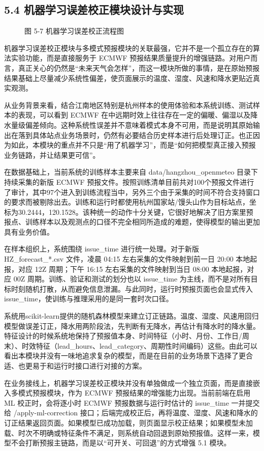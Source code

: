 \subsection{5.4 机器学习误差校正模块设计与实现}

\begin{figure}[htbp]
\centering
\caption{图 5-7  机器学习误差校正流程图}
\label{fig:5-7}
\end{figure}

机器学习误差校正模块与多模式预报模块的关联最强，它并不是一个孤立存在的算法实验功能，而是直接服务于 ECMWF 预报结果质量提升的增强链路。对用户而言，真正关心的仍然是“未来天气会怎样”，而这一模块所做的事情，是在原始预报结果基础上尽量减少系统性偏差，使页面展示的温度、湿度、风速和降水更贴近真实观测。

从业务背景来看，结合江南地区特别是杭州样本的使用体验和本系统训练、测试样本的表现，可以看到 ECMWF 在中远期时效上往往存在一定的偏暖、偏湿以及降水量级偏差倾向。这种系统性误差并不意味着模式本身不可用，而是说明其原始输出在落到具体站点业务场景时，仍然有必要结合历史样本进行后处理订正。也正因为如此，本模块的重点并不只是“用了机器学习”，而是“如何把模型真正接入预报业务链路，并让结果更可信”。

在数据基础上，当前系统的训练样本主要来自 data/hangzhou\_openmeteo 目录下持续采集的新版 ECMWF 预报文件。按照训练清单目前共对100个预报文件进行了审计，其中97个进入到训练流程当中，另外三个由于采集的时间不符合支持窗口的要求而被剔除出去。训练和运行时都使用杭州国家站/馒头山作为目标站点，坐标为30.2444，120.1528。该种统一的动作十分关键，它很好地解决了旧方案里预报点、训练样本以及观测点的口径不完全相同所造成的难题，使得模型的输出更加具有业务价值。

在样本组织上，系统围绕 issue\_time 进行统一处理。对于新版 HZ\_forecast\_*.csv 文件，凌晨 04:15 左右采集的文件映射到前一日 20:00 本地起报，对应 12Z 周期；下午 16:15 左右采集的文件映射到当日 08:00 本地起报，对应 00Z 周期。训练、验证和测试的划分也以 issue\_time 为主线，而不是对所有目标时刻随机打散，从而避免信息泄漏。与此同时，运行时预报页面也会显式传入 issue\_time，使训练与推理采用的是同一套时次口径。

系统用scikit-learn提供的随机森林模型来建立订正链路。温度、湿度、风速用回归模型做误差订正，降水用两阶段法，先判断有无降水，再估计有降水时的降水量。特征设计的时候系统地保持了预报值本身、时间特征（小时、月份、工作日/周末）、时效特征（lead\_hours、lead\_category、周期性时间编码）这些。由此可以看出本模块并没有一味地追求复杂的模型，而是在目前的业务场景下选择了更合适、也更易于和运行时接口进行对接的方案。

在业务接线上，机器学习误差校正模块并没有单独做成一个独立页面，而是直接嵌入多模式预报模块，作为 ECMWF 预报结果的增强能力出现。当前前端在启用 ML 校正时，会将逐小时 ECMWF 预报数据与运行时估计的 issue\_time 一并提交给 /apply-ml-correction 接口；后端完成校正后，再将温度、湿度、风速和降水的订正结果返回页面。如果模型已成功加载，则页面显示校正结果；如果模型未加载、时次不明确或特征条件不满足，则系统自动回退到原始预报值。这样一来，模型不会打断预报主链路，而是以“可开关、可回退”的方式增强 5.1 模块。

